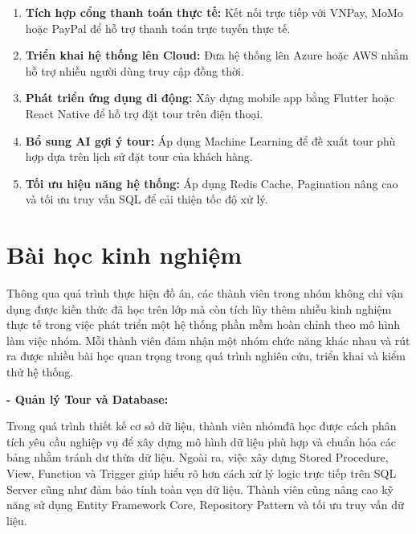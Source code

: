 \begin{enumerate}

  \item \textbf{Tích hợp cổng thanh toán thực tế:}
  Kết nối trực tiếp với VNPay, MoMo hoặc PayPal để hỗ trợ thanh toán trực tuyến thực tế.

  \item \textbf{Triển khai hệ thống lên Cloud:}
  Đưa hệ thống lên Azure hoặc AWS nhằm hỗ trợ nhiều người dùng truy cập đồng thời.

  \item \textbf{Phát triển ứng dụng di động:}
  Xây dựng mobile app bằng Flutter hoặc React Native để hỗ trợ đặt tour trên điện thoại.

  \item \textbf{Bổ sung AI gợi ý tour:}
  Áp dụng Machine Learning để đề xuất tour phù hợp dựa trên lịch sử đặt tour của khách hàng.

  \item \textbf{Tối ưu hiệu năng hệ thống:}
  Áp dụng Redis Cache, Pagination nâng cao và tối ưu truy vấn SQL để cải thiện tốc độ xử lý.

\end{enumerate}


\section{Bài học kinh nghiệm}\label{Sec5.5}

Thông qua quá trình thực hiện đồ án, các thành viên trong nhóm không chỉ
vận dụng được kiến thức đã học trên lớp mà còn tích lũy thêm nhiều kinh nghiệm
thực tế trong việc phát triển một hệ thống phần mềm hoàn chỉnh theo mô hình
làm việc nhóm. Mỗi thành viên đảm nhận một nhóm chức năng khác nhau và rút ra
được nhiều bài học quan trọng trong quá trình nghiên cứu, triển khai và kiểm thử hệ thống.

\vspace{0.5cm}

\noindent\textbf{- Quản lý Tour và Database:}

Trong quá trình thiết kế cơ sở dữ liệu, thành viên nhómđã học được cách
phân tích yêu cầu nghiệp vụ để xây dựng mô hình dữ liệu phù hợp và chuẩn hóa
các bảng nhằm tránh dư thừa dữ liệu. Ngoài ra, việc xây dựng Stored Procedure,
View, Function và Trigger giúp hiểu rõ hơn cách xử lý logic trực tiếp trên
SQL Server cũng như đảm bảo tính toàn vẹn dữ liệu. Thành viên cũng nâng cao
kỹ năng sử dụng Entity Framework Core, Repository Pattern và tối ưu truy vấn dữ liệu.

